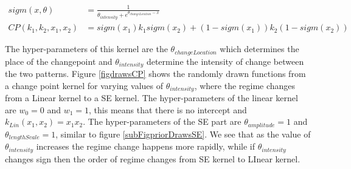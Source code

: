 \begin{align}
sigm(x, \theta) & = \frac{1}{\theta_{intensity} + e^{\theta_{changeLocation}-x}} \label{eqCh4SigmoidalFUnction} \\
CP(k_{1}, k_{2}, x_{1}, x_{2}) & = sigm(x_{1})k_{1}sigm(x_{2}) + (1-sigm(x_{1}))k_{2}(1-sigm(x_{2})) \label{eq:changePointKernel}
\end{align}

The hyper-parameters of this kernel are the $\theta_{changeLocation}$ which determines the place of the changepoint and $\theta_{intensity}$ determine the intensity of change between the two patterns. Figure \ref{figdrawsCP} shows the randomly drawn functions from a change point kernel for varying values of $\theta_{intensity}$, where the regime changes from a Linear kernel to a SE kernel. The hyper-parameters of the linear kernel are $w_{0}=0$ and $w_{1}=1$, this means that there is no intercept and $k_{Lin}(x_{1}, x_{2}) = x_{1}x_{2}$. The hyper-parameters of the SE part are $\theta_{amplitude}=1$ and $\theta_{lengthScale}=1$, similar to figure \ref{subFigpriorDrawsSE}. We see that as the value of $\theta_{intensity}$ increases the regime change happens more rapidly, while if $\theta_{intensity}$ changes sign then the order of regime changes from SE kernel to LInear kernel.

